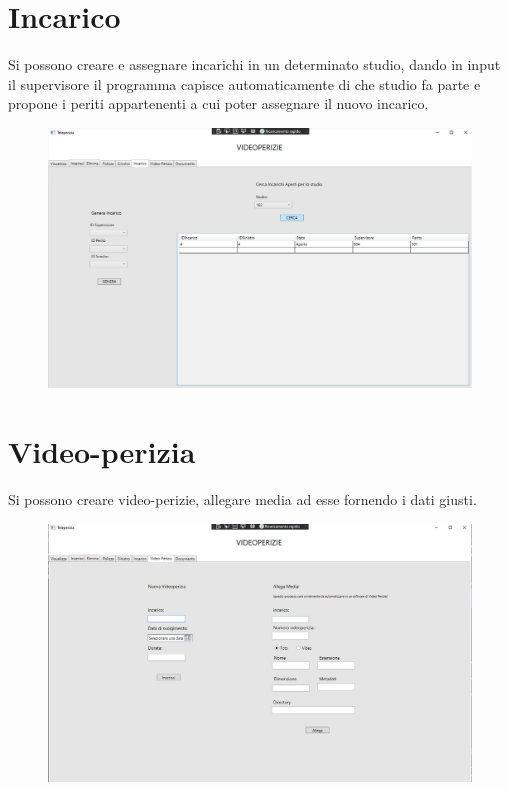 \documentclass[a4paper,12pt]{report}
\begin{document}
\section{Incarico}
Si possono creare e assegnare incarichi in un determinato studio, dando in input il supervisore il programma capisce automaticamente di che studio fa parte e propone i periti appartenenti a cui poter assegnare il nuovo incarico.

\begin{figure}[ht]
    \begin{center}
        \centering
        \includegraphics[width=\textwidth]{img/Applicazione/Incarichi.png}
    \end{center}
\end{figure}

\clearpage
\section{Video-perizia}
Si possono creare video-perizie, allegare media ad esse fornendo i dati giusti.

\begin{figure}[ht]
    \begin{center}
        \centering
        \includegraphics[width=\textwidth]{img/Applicazione/VideoPerizia.png}
    \end{center}
\end{figure}
\clearpage
\end{document}
